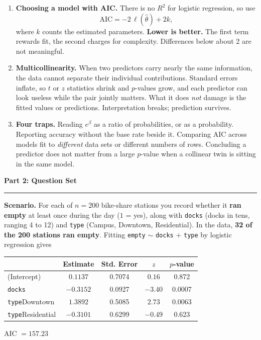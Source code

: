 \documentclass[11pt]{article}
\newcommand{\parttitle}[1]{%
  \par\medskip\noindent
  {\large\bfseries #1}\par
  \vspace{-.5em}\noindent\rule{\linewidth}{0.4pt}\par\smallskip}
\begin{document}
{\begin{enumerate}[label=\textbf{\arabic*.}, wide=0pt, itemsep=.5em, topsep=.5em]
\item \textbf{Choosing a model with AIC.} There is no $R^2$ for logistic regression, so use
\[
\text{AIC} = -2\,\ell(\hat\theta) + 2k,
\]
where $k$ counts the estimated parameters. \textbf{Lower is better.} The first term rewards fit,
the second charges for complexity. Differences below about 2 are not meaningful.

\item \textbf{Multicollinearity.} When two predictors carry nearly the same information, the data
cannot separate their individual contributions. Standard errors inflate, so $t$ or $z$ statistics
shrink and $p$-values grow, and each predictor can look useless while the pair jointly matters.
What it does \emph{not} damage is the fitted values or predictions. Interpretation breaks;
prediction survives.

\item \textbf{Four traps.} Reading $e^{\beta}$ as a ratio of probabilities, or as a probability.
Reporting accuracy without the base rate beside it. Comparing AIC across models fit to
\emph{different} data sets or different numbers of rows. Concluding a predictor does not matter
from a large $p$-value when a collinear twin is sitting in the same model.

\end{enumerate}

}

\newpage

\parttitle{Part 2: Question Set}

\noindent\textbf{Scenario.} For each of $n = 200$ bike-share stations you record whether it
\textbf{ran empty} at least once during the day ($1$ = yes), along with \texttt{docks} (docks in
tens, ranging 4 to 12) and \texttt{type} (Campus, Downtown, Residential). In the data,
\textbf{32 of the 200 stations ran empty}. Fitting \texttt{empty} $\sim$ \texttt{docks} $+$
\texttt{type} by logistic regression gives

\begin{center}
\renewcommand{\arraystretch}{1.2}
\begin{tabular}{lcccc}
\toprule
 & \textbf{Estimate} & \textbf{Std. Error} & \textbf{$z$} & \textbf{$p$-value} \\
\midrule
(Intercept) & $0.1137$ & 0.7074 & $0.16$ & 0.872 \\
\texttt{docks} & $-0.3152$ & 0.0927 & $-3.40$ & 0.0007 \\
\texttt{type}Downtown & $1.3892$ & 0.5085 & $2.73$ & 0.0063 \\
\texttt{type}Residential & $-0.3101$ & 0.6299 & $-0.49$ & 0.623 \\
\bottomrule
\end{tabular}
\qquad AIC $= 157.23$
\end{center}
\end{document}
